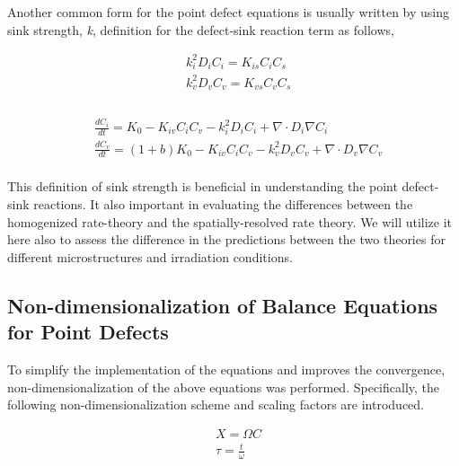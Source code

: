 \documentclass[utf8]{frontiersSCNS} %
\begin{document}
    Another common form for the point defect equations is usually written by using sink strength, \textit{k},  definition for the defect-sink reaction term as follows,

\begin{equation}
  \begin{aligned}
    &k_i^2D_iC_i = K_{is}C_iC_s \\
    &k_v^2D_vC_v = K_{vs}C_vC_s \\
  \end{aligned}
  \label{equation:sink_reaction_term}
\end{equation}\\
\begin{equation}
  \begin{aligned}
    &\frac{dC_i}{dt} = K_0 - K_{iv}C_iC_v - k_i^2D_iC_i + \nabla\cdot D_i\nabla C_i\\
    &\frac{dC_v}{dt} = (1+b)K_0 - K_{iv}C_iC_v - k_v^2D_vC_v + \nabla\cdot D_v\nabla C_v\\
  \end{aligned}
  \label{equation:point_defect_equations_sink_strength}
\end{equation}

    This definition of sink strength is beneficial in understanding the point defect-sink reactions. It also important in evaluating the differences between the homogenized rate-theory and the spatially-resolved rate theory. We will utilize it here also to assess the  difference in the predictions between the two theories for different microstructures and irradiation conditions. 

\subsection{Non-dimensionalization of Balance Equations for Point Defects}
    To simplify the implementation of the equations and improves the convergence, non-dimensionalization of the above equations was performed. Specifically, the following non-dimensionalization scheme and scaling factors are introduced.

    \begin{equation}
      \begin{aligned}
        &X = \Omega C\\
        &\tau = \frac{t}{\omega}\\
      \end{aligned}
      \label{equation:non-dimensionalization_variables}
    \end{equation}
\end{document}
